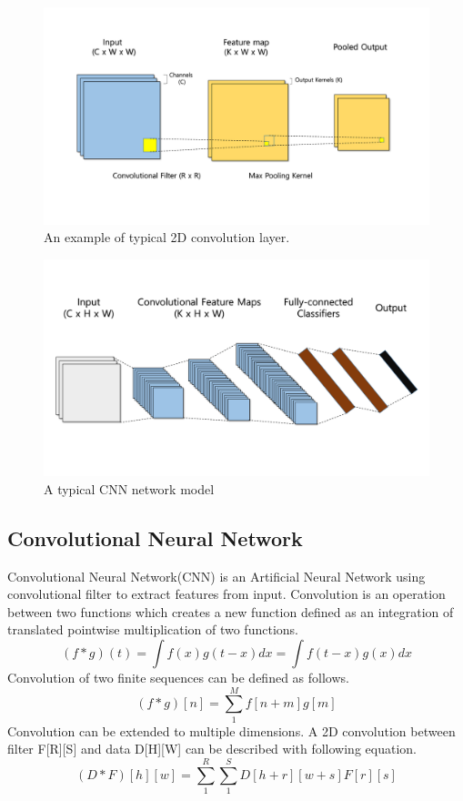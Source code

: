 \begin{figure}
  \centering
  \includegraphics[width=\linewidth]{./figures/conv_2dlayer}
  \caption{An example of typical 2D convolution layer. }
  \label{fig_convlayer}
\end{figure}
\begin{figure}
  \centering
  \includegraphics[width=\linewidth]{./figures/conv_model}
  \caption{A typical CNN network model }
  \label{fig_convmodel}
\end{figure}

\subsection{Convolutional Neural Network}
Convolutional Neural Network(CNN) is an Artificial Neural Network using convolutional filter to extract features from input.
Convolution is an operation between two functions which creates a new function defined as an integration of translated pointwise multiplication of two functions.
\begin{equation}
\left ( f * g \right )(t) = \int f(x)g(t-x)dx = \int f(t-x)g(x)dx
\label{def_convolution}
\end{equation}
Convolution of two finite sequences can be defined as follows.
\begin{equation}
\label{def_discrete}
\left ( f * g \right )[n] = \sum_{1}^{M} f[n + m]g[m]
\end{equation}
Convolution can be extended to multiple dimensions.
A 2D convolution between filter F[R][S] and data D[H][W] can be described with following equation.
\begin{equation}
\label{def_2d}
\left ( D * F \right )[h][w] = \sum_{1}^{R}\sum_{1}^{S} D[h + r][w + s] F[r][s]
\end{equation}

